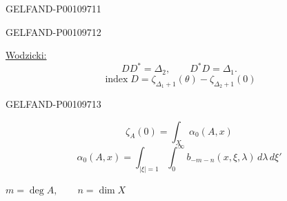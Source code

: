 \begin{GelfandAdjacentEvidence}{GELFAND-P001097}{11}

\end{GelfandAdjacentEvidence}
\begin{GelfandAdjacentEvidence}{GELFAND-P001097}{12}


\underline{Wodzicki:}
\[
DD^*=\Delta_2,\qquad D^*D=\Delta_1.
\]
\[
\operatorname{index}D=\zeta_{\Delta_1+1}(\theta)-\zeta_{\Delta_2+1}(0)
\]
\end{GelfandAdjacentEvidence}
\begin{GelfandAdjacentEvidence}{GELFAND-P001097}{13}


\[
\zeta_A(0)=\int_X\alpha_0(A,x)
\]
\[
\alpha_0(A,x)=\int_{\lvert\xi\rvert=1}\int_0^\infty
b_{-m-n}(x,\xi,\lambda)\,d\lambda\,d\xi'
\]
\end{GelfandAdjacentEvidence}


$m=\operatorname{deg}A,\qquad n=\dim X$


